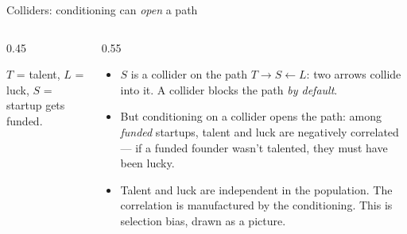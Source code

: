 \documentclass[aspectratio=169,11pt]{beamer}
\begin{document}
\begin{frame}{Colliders: conditioning can \emph{open} a path}
\begin{columns}
\begin{column}{0.45\textwidth}
\begin{center}
\end{center}
\smallskip
{\small $T$ = talent, $L$ = luck, $S$ = startup gets funded.}
\end{column}
\begin{column}{0.55\textwidth}
\begin{itemize}
	\item $S$ is a \alert{collider} on the path $T \rightarrow S \leftarrow L$: two
	arrows collide into it. A collider \alert{blocks} the path \emph{by default}.

	\item But \alert{conditioning on a collider opens the path}: among \emph{funded}
	startups, talent and luck are negatively correlated --- if a funded founder wasn't
	talented, they must have been lucky.

	\item Talent and luck are independent in the population. The correlation is
	manufactured by the conditioning. This is \alert{selection bias, drawn as a picture}.
\end{itemize}
\end{column}
\end{columns}
\end{frame}
\end{document}
